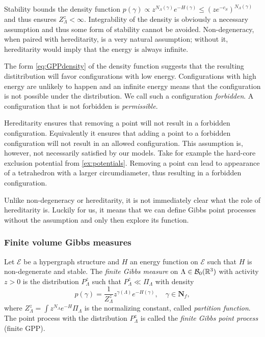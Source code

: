 Stability bounds the density function $p(\gamma) \propto z^{N_\Lambda( \gamma)}e^{-H(\gamma)} \leq (z e^{-c_S})^{N_\Lambda(\gamma)} $ and thus ensures $Z^z_\Lambda < \infty$. Integrability of the density is obviously a necessary assumption and thus some form of stability cannot be avoided. 
Non-degeneracy, when paired with hereditarity, is a very natural assumption; without it, hereditarity would imply that the energy is always infinite.\newline

The form \ref{eq:GPPdensity} of the density function suggests that the resulting distitribution will favor configurations with low energy. Configurations with high energy are unlikely to happen and an infinite energy means that the configuration is not possible under the distribution. We call such a configuration \textit{forbidden}. A configuration that is not forbidden is \textit{permissible}.  \newline

Hereditarity ensures that removing a point will not result in a forbidden configuration. Equivalently it ensures that adding a point to a forbidden configuration will not result in an allowed configuration. This assumption is, however, not necessarily satisfied by our models. Take for example the hard-core exclusion potential from \ref{ex:potentials}. Removing a point can lead to appearance of a tetrahedron with a larger circumdiameter, thus resulting in a forbidden configuration.\newline

Unlike non-degeneracy or hereditarity, it is not immediately clear what the role of hereditarity is. Luckily for us, it means that we can define Gibbs point processes without the assumption and only then explore its function.



\subsubsection{Finite volume Gibbs measures}

\begin{definition}\label{def:fGPP}
	Let $\mathcal E$ be a hypergraph structure and $H$ an energy function on $\mathcal E$ such that $H$ is non-degenerate and stable. The \textit{finite Gibbs measure} on $\Lambda\in \mathcal B_0({\mathbb R^3})$ with activity $z>0$ is the distribution $P^z_\Lambda$ such that $P^z_\Lambda \ll \Pi_\Lambda$ with density
	$$p(\gamma) = \frac 1{Z^{z}_\Lambda} z^{\gamma(\Lambda)} e^{-H(\gamma)},\quad \gamma \in \mathbf N_f,$$
where  $Z^z_\Lambda = \int z^{N_\Lambda} e^{-H} \Pi_\Lambda$ is the normalizing constant, called \textit{partition function}. \newline
The point process with the distribution $P^z_{\Lambda}$ is called the \textit{finite Gibbs point process} (finite GPP). 
\end{definition}

